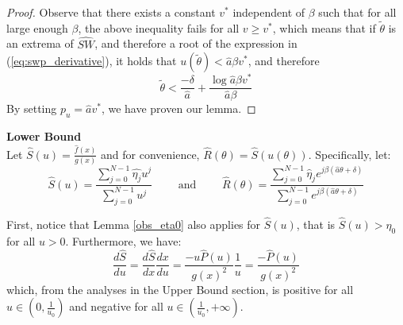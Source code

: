 \documentclass{article}
\begin{document}
\begin{proof}
Observe that there exists a constant $v^*$ independent of $\beta$ such that for all large enough $\beta$, the above inequality fails for all $v \ge v^*$, which means that if $\tilde{\theta}$ is an extrema of $\widehat{SW}$, and therefore a root of the expression in (\ref{eq:swp_derivative}), it holds that $u(\tilde{\theta}) < \hat{a}\beta v^*$, and therefore 
\[
\tilde{\theta} < \frac{-\delta}{\hat{a}} + \frac{\log \hat{a}\beta v^*}{\hat{a}\beta}
\]
By setting $p_u = \hat{a}v^*$, we have proven our lemma.
\end{proof}

\textbf{Lower Bound} \\
Let $\hat{S}(u) = \frac{\hat{f}(x)}{g(x)}$ and for convenience, $\hat{R}(\theta) = \hat{S}(u(\theta))$. Specifically, let:
\[
\hat{S}(u) = \frac{\sum_{j=0}^{N-1} \hat{\eta_j} u^j}{\sum_{j=0}^{N-1} u^j} \qquad \text{ and } \qquad \hat{R}(\theta) = \frac{\sum_{j=0}^{N-1} \hat{\eta}_j e^{j\beta(\hat{a}\theta+\delta)}}{\sum_{j=0}^{N-1} e^{j\beta(\hat{a}\theta+\delta)}}
\]

First, notice that Lemma \ref{obs_eta0} also applies for $\hat{S}(u)$, that is $\hat{S}(u) > \eta_0$ for all $u > 0$. Furthermore, we have:
\[
\frac{d\hat{S}}{du} = \frac{d\hat{S}}{dx} \frac{dx}{du} = \frac{-u\hat{P}(u)}{g(x)^2} \frac{1}{u} = \frac{-\hat{P}(u)}{g(x)^2}
\]
which, from the analyses in the Upper Bound section, is positive for all $u \in (0, \frac{1}{u_0})$ and negative for all $u \in (\frac{1}{u_0}, +\infty)$. 
\end{document}
